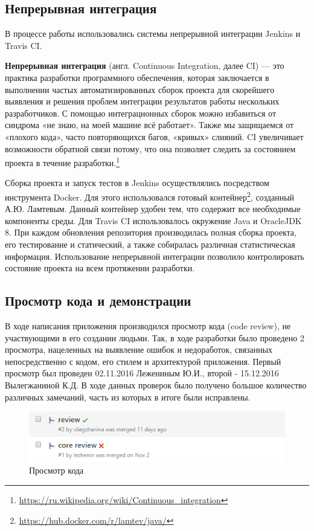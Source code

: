 \subsection{Непрерывная интеграция}

В процессе работы использовались системы непрерывной интеграции Jenkins и Travis CI.

\textbf{Непрерывная интеграция} (англ. Continuous Integration, далее CI) — это практика разработки программного обеспечения, которая заключается в выполнении частых автоматизированных сборок проекта для скорейшего выявления и решения проблем интеграции результатов работы нескольких разработчиков. С помощью интеграционных сборок можно избавиться от синдрома «не знаю, на моей машине всё работает». Также мы защищаемся от «плохого кода», часто повторяющихся багов, «кривых» слияний. CI увеличивает возможности обратной связи потому, что она позволяет следить за состоянием проекта в течение разработки.\footnote{\url{https://ru.wikipedia.org/wiki/Continuous_integration}}

Сборка проекта и запуск тестов в Jenkins осуществлялись посредством инструмента Docker. Для этого использовался готовый контейнер\footnote{\url{https://hub.docker.com/r/lamtev/java/}}, созданный А.Ю. Ламтевым. Данный контейнер удобен тем, что содержит все необходимые компоненты среды. Для Travis CI использовалось окружение Java и OracleJDK 8. При каждом обновления репозитория производилась полная сборка проекта, его тестирование и статический, а также собиралась различная статистическая информация. Использование непрерывной интеграции позволило контролировать состояние проекта на всем протяжении разработки.  

\subsection{Просмотр кода и демонстрации}

В ходе написания приложения производился просмотр кода (code review), не участвующими в его создании людьми. Так, в ходе разработки было проведено 2 просмотра, нацеленных на выявление ошибок и недоработок, связанных  непосредственно с кодом, его стилем и архитектурой приложения. Первый просмотр был проведен 02.11.2016 Лежениным Ю.И., второй - 15.12.2016 Вылегжаниной К.Д. В ходе данных проверок было получено большое количество различных замечаний, часть из которых в итоге были исправлены.

\begin{figure}[H]
	\begin{center}
		\includegraphics[scale=0.85]{pics/review}
		\caption{Просмотр кода} 
		\label{pic:findbugs} %
	\end{center}
\end{figure}

